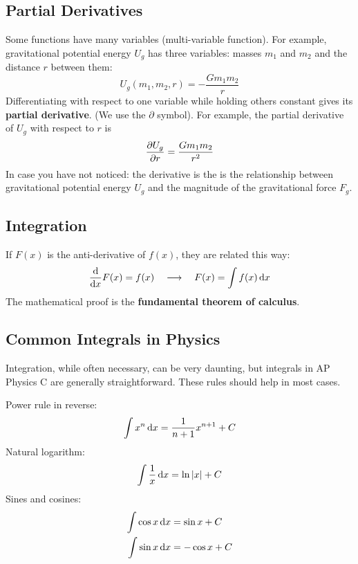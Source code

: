 \documentclass{../../../oss-handout}
\begin{document}
\subsection{Partial Derivatives}
Some functions have many variables (multi-variable function). For example,
gravitational potential energy $U_g$ has three variables: masses $m_1$ and
$m_2$ and the distance $r$ between them:
\begin{equation*}
    U_g(m_1,m_2,r)=-\frac{Gm_1m_2}{r}
\end{equation*}
Differentiating with respect to one variable while holding others constant
gives its \textbf{partial derivative}. (We use the $\partial$ symbol). For
example, the partial derivative of $U_g$ with respect to $r$ is
\begin{equation*}
    \diffp{U_g}{r}=\frac{Gm_1m_2}{r^2}
\end{equation*}
In case you have not noticed: the derivative is the is the relationship between
gravitational potential energy $U_g$ and the magnitude of the gravitational
force $F_g$.


\subsection{Integration}

If $F(x)$ is the anti-derivative of $f(x)$, they are related this way:
\begin{equation*}
  \diff{}xF(x)=f(x)\quad\longrightarrow\quad F(x)=\int f(x)\dl x
\end{equation*}
The mathematical proof is the \textbf{fundamental theorem of calculus}.


\subsection{Common Integrals in Physics}
Integration, while often necessary, can be very daunting, but integrals in AP
Physics C  are generally straightforward. These rules should help in most cases.

Power rule in reverse:
\begin{equation*}
  \int x^n\dl x=\frac1{n+1}x^{n+1}+C
\end{equation*}
Natural logarithm:
\begin{equation*}
  \int \frac1x\dl x =\ln |x|+C 
\end{equation*}
Sines and cosines:
\begin{align*}
  \int\cos x\dl x&=\sin x+C\\
  \int\sin x\dl x&=-\cos x+C
\end{align*}
\end{document}
